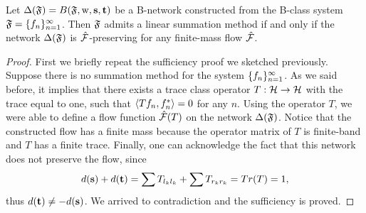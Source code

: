 \documentclass[12pt]{article}
\begin{document}
    \begin{theorem}
      \label{thm-graph-eq}
        Let $\net(\fsys) = B(\fsys, \wtp, \source, \sink)$ be a B-network constructed
          from the B-class system $\fsys = \seq{f}$.
        Then $\fsys$ admits a linear summation method if and only if
          the network $\net(\fsys)$ is $\flow$-preserving for any
          finite-mass flow $\flow$.
    \end{theorem}
    \begin{proof}
      First we briefly repeat the sufficiency proof we sketched previously.
      Suppose there is no summation method for the system $\seq{f}$.
      As we said before, it implies that there exists a trace class operator $T : \cal{H} \to \cal{H}$ with
      the trace equal to one, such that $\inner{Tf_n}{f_n^*} = 0$ for any $n$.
      Using the operator $T$, we were able to define a flow function $\flow(T)$ on the network
      $\net(\fsys)$.
      Notice that the constructed flow has a finite mass because the operator matrix of $T$ is finite-band and $T$ has a finite trace.
      Finally, one can acknowledge the fact that this network does not preserve the flow, since
      \[
        d(\source) + d(\sink) = \sum T_{l_k l_k} + \sum T_{r_k r_k} = Tr(T) = 1,
      \]
      thus $d(\sink) \neq -d(\source)$.
      We arrived to contradiction and the sufficiency is proved.


\end{proof}
\end{document}
